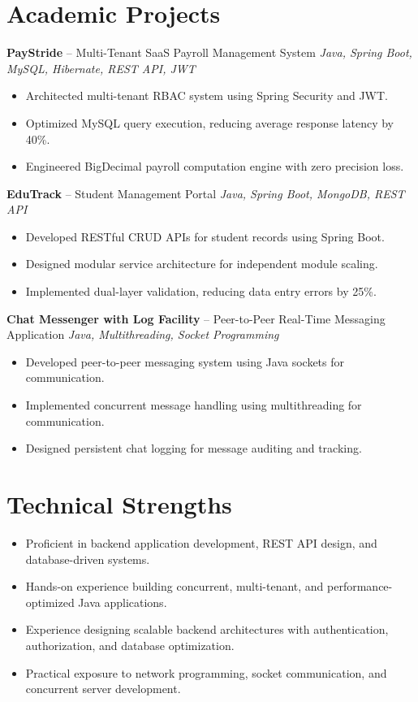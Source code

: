 \documentclass[10.5pt,a4paper]{article}
\begin{document}
\section{Academic Projects}
\textbf{PayStride} -- Multi-Tenant SaaS Payroll Management System \hfill \textit{Java, Spring Boot, MySQL, Hibernate, REST API, JWT}
\begin{itemize}
  \item Architected multi-tenant RBAC system using Spring Security and JWT.
  \item Optimized MySQL query execution, reducing average response latency by 40\%.
  \item Engineered BigDecimal payroll computation engine with zero precision loss.
\end{itemize}
\vspace{4pt}
\textbf{EduTrack} -- Student Management Portal \hfill \textit{Java, Spring Boot, MongoDB, REST API}
\begin{itemize}
  \item Developed RESTful CRUD APIs for student records using Spring Boot.
  \item Designed modular service architecture for independent module scaling.
  \item Implemented dual-layer validation, reducing data entry errors by 25\%.
\end{itemize}
\vspace{4pt}
\textbf{Chat Messenger with Log Facility} -- Peer-to-Peer Real-Time Messaging Application \hfill \textit{Java, Multithreading, Socket Programming}
\begin{itemize}
  \item Developed peer-to-peer messaging system using Java sockets for communication.
  \item Implemented concurrent message handling using multithreading for communication.
  \item Designed persistent chat logging for message auditing and tracking.
\end{itemize}
\section{Technical Strengths}
\begin{itemize}
  \item Proficient in backend application development, REST API design, and database-driven systems.
  \item Hands-on experience building concurrent, multi-tenant, and performance-optimized Java applications.
  \item Experience designing scalable backend architectures with authentication, authorization, and database optimization.
  \item Practical exposure to network programming, socket communication, and concurrent server development.
\end{itemize}
\end{document}
